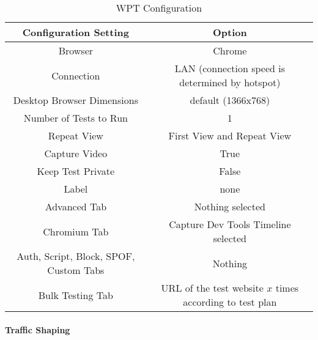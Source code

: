 



\begin{table}[h]
	\small
	\centering
	\begin{tabular}{  | c | c | } 
	\hline
	\cellcolor{lightgrey} Configuration Setting & \cellcolor{lightgrey} Option \\
	\hline
	Browser & Chrome \\
	\hline
	Connection & LAN (connection speed is determined by hotspot) \\
	Desktop Browser Dimensions & default (1366x768) \\
	Number of Tests to Run & 1 \\
	Repeat View & First View and Repeat View \\
	Capture Video & True \\
	Keep Test Private & False \\
	Label & none \\
	\hline	  
	Advanced Tab & Nothing selected \\
	Chromium Tab & Capture Dev Tools Timeline selected  \\
	Auth, Script, Block, SPOF, Custom Tabs & Nothing  \\
	Bulk Testing Tab & URL of the test website $x$ times according to test plan \\
	\hline
	\end{tabular}
	\medskip
	\caption{WPT Configuration}
	\label{table:wpt_configuration}
\end{table}





\paragraph{Traffic Shaping}





